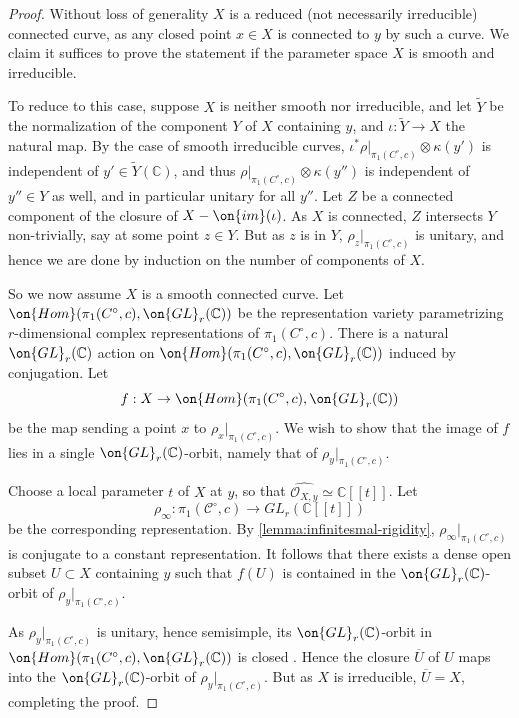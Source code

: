\begin{proof}
Without loss of generality $X$ is a reduced (not necessarily irreducible) connected curve, as any closed point $x\in X$ is connected to $y$ by such a curve. We claim it suffices to prove the statement if the parameter space $X$ is smooth and irreducible.

To reduce to this case, suppose $X$ is neither smooth nor irreducible, and let $\tilde Y$ be the normalization of the component $Y$ of $X$ containing $y$, and $\iota:
\tilde Y\to X$ the natural map. By the case of smooth irreducible curves, $\iota^*\rho|_{\pi_1(C^\circ, c)}\otimes \kappa(y')$ is independent of $y'\in \tilde Y(\mathbb{C})$, and thus $\rho|_{\pi_1(C^\circ, c)}\otimes \kappa(y'')$ is independent of $y''\in Y$ as well, and in particular unitary for all $y''$. Let $Z$ be a connected component of the closure of $X-\on{im}(\iota)$. As $X$ is connected, $Z$ intersects $Y$ non-trivially, say at some point $z\in Y$. But as $z$ is in $Y$, $\rho_z|_{\pi_1(C^\circ, c)}$ is unitary, and hence we are done by induction on the number of components of $X$.

So we now assume $X$ is a smooth connected curve. Let $\on{Hom}(\pi_1(C^\circ, c), \on{GL}_r(\mathbb{C}))$ be the representation variety parametrizing $r$-dimensional complex representations of $\pi_1(C^\circ, c)$. There is a natural $\on{GL}_r(\mathbb{C})$ action on $\on{Hom}(\pi_1(C^\circ, c), \on{GL}_r(\mathbb{C}))$ induced by conjugation. Let $$f: X\to \on{Hom}(\pi_1(C^\circ, c), \on{GL}_r(\mathbb{C}))$$ be the map sending a point $x$ to $\rho_x|_{\pi_1(C^\circ, c)}$. We wish to show that the image of $f$ lies in a single $\on{GL}_r(\mathbb{C})$-orbit, namely that of $\rho_y|_{\pi_1(C^\circ, c)}$.

Choose a local parameter $t$ of $X$ at $y$, so that $\widehat{\mathscr{O}_{X,y}}\simeq \mathbb{C}[[t]]$. Let $$\rho_\infty: \pi_1(\mathscr{C}^\circ, c)\to GL_r(\mathbb{C}[[t]])$$ be the corresponding representation. By \autoref{lemma:infinitesmal-rigidity}, $\rho_\infty|_{\pi_1(C^\circ, c)}$ is conjugate to a constant representation. It follows that there exists a dense open
subset $U\subset X$ containing $y$ such that $f(U)$ is contained in the
$\on{GL}_r(\mathbb{C})$-orbit of $\rho_y|_{\pi_1(C^\circ, c)}$.

As $\rho_y|_{\pi_1(C^\circ, c)}$ is unitary, hence semisimple, its $\on{GL}_r(\mathbb{C})$-orbit in $\on{Hom}(\pi_1(C^\circ, c), \on{GL}_r(\mathbb{C}))$ is closed \cite[Theorem 30]{sikora2012character}. Hence the closure $\overline{U}$ of $U$ maps into the $\on{GL}_r(\mathbb{C})$-orbit of $\rho_y|_{\pi_1(C^\circ, c)}$. But as $X$ is irreducible, $\overline{U}=X$, completing the proof.
\end{proof}
